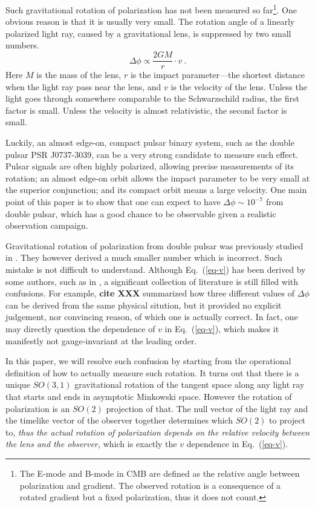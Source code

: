 \documentclass[aps,showpacs,onecolumn,floats,prd,superscriptaddress,nofootinbib]{revtex4}
\begin{document}
Such gravitational rotation of polarization has not been measured so far\footnote{The E-mode and B-mode in CMB are defined as the relative angle between polarization and gradient. The observed rotation is a consequence of a rotated gradient but a fixed polarization, thus it does not count.}.  One obvious reason is that it is usually very small. The rotation angle of a linearly polarized light ray, caused by a gravitational lens, is suppressed by two small numbers.
\begin{equation}
\Delta\phi \propto \frac{2GM}{r} \cdot v~.
\label{eq-v}
\end{equation}
Here $M$ is the mass of the lens, $r$ is the impact parameter---the shortest distance when the light ray pass near the lens, and $v$ is the velocity of the lens.  Unless the light goes through somewhere comparable to the Schwarzschild radius, the first factor is small. Unless the velocity is almost relativistic, the second factor is small. 

Luckily, an almost edge-on, compact pulsar binary system, such as the double pulsar PSR J0737-3039, can be a very strong candidate to measure such effect. Pulsar signals are often highly polarized, allowing precise measurements of its rotation; an almost edge-on orbit allows the impact parameter to be very small at the superior conjunction; and its compact orbit means a large velocity. One main point of this paper is to show that one can expect to have $\Delta\phi\sim 10^{-7}$ from double pulsar, which has a good chance to be observable given a realistic observation campaign.

Gravitational rotation of polarization from double pulsar was previously studied in \cite{RugTar06}. They however derived a much smaller number which is incorrect. Such mistake is not difficult to understand. Although Eq.~(\ref{eq-v}) has been derived by some authors, such as in \cite{KopMas01}, a significant collection of literature is still filled with confusions. For example, {\bf cite XXX} summarized how three different values of $\Delta\phi$ can be derived from the same physical sitution, but it provided no explicit judgement, nor convincing reason, of which one is actually correct. In fact, one may directly question the dependence of $v$ in Eq.~(\ref{eq-v}), which makes it manifestly not gauge-invariant at the leading order.

In this paper, we will resolve such confusion by starting from the operational definition of how to actually measure such rotation.  It turns out that there is a unique $SO(3,1)$ gravitational rotation of the tangent space along any light ray that starts and ends in asymptotic Minkowski space. However the rotation of polarization is an $SO(2)$ projection of that. The null vector of the light ray and the timelike vector of the observer together determines which $SO(2)$ to project to, {\it thus the actual rotation of polarization depends on the relative velocity between the lens and the observer,} which is exactly the $v$ dependence in Eq.~(\ref{eq-v}).
\end{document}

